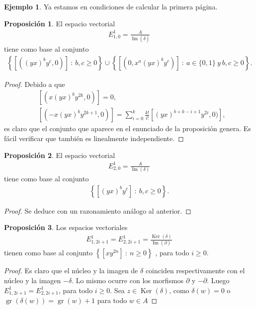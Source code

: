 \documentclass[a4paper,oneside,fleqn,11pt]{report}
\theoremstyle{definition}
\theoremstyle{definition}
\newtheorem{example}{Ejemplo}[section]
\newtheorem{prop}{Proposición}
\numberwithin{prop}{subsection}
\DeclareMathOperator\Ima{Im}
\DeclareMathOperator\Ker{Ker}
\DeclareMathOperator\gr{gr}
\begin{document}
\begin{example}
Ya estamos en condiciones de calcular la primera página. 
\begin{prop}
	El espacio vectorial
	\begin{align*}
		E_{1,0}^1 = \frac{A}{\Ima(\overline{\delta})}
	\end{align*}
	tiene como base al conjunto
	\begin{align*}
		\left\{ \left[((yx)^by^c, 0)\right]\ :\ b,c \geq 0\right\}
			\cup \left\{ \left[(0, x^a(yx)^by^c)\right]\ :\ a \in \{0, 1\}\ y\ b,c \geq 0\right\}. 
	\end{align*}
\end{prop}
\begin{proof}
	Debido a que
	\begin{align*}
		&\left[(x(yx)^by^{2k}, 0)\right] = 0, \\
		&\left[(-x(yx)^by^{2k + 1}, 0)\right] = \sum_{i = 0}^{k}\frac{k!}{i!}\left[(yx)^{b + k - i + 1}y^{2i}, 0)\right],
	\end{align*}
	es claro que el conjunto que aparece en el enunciado de la proposición genera. Es fácil verificar
	que también es linealmente independiente.
\end{proof}
\begin{prop}
	El espacio vectorial
	\begin{align*}
		E_{2,0}^1 = \frac{A}{\Ima(\delta)}
	\end{align*}
	tiene como base al conjunto
	\begin{align*}
		\left\{ \left[(yx)^by^c\right] \ :\ b,c \geq 0\right\}. 
	\end{align*}
\end{prop}
\begin{proof}
	Se deduce con un razonamiento análogo al anterior.
\end{proof}
\begin{prop}
	Los espacios vectoriales
	\begin{align*}
		E_{1,2i + 1}^1 = E_{2, 2i + 1}^1 = \frac{\Ker(\delta)}{\Ima(\partial)}
	\end{align*}
	tienen como base al conjunto $\left\{ \left[xy^{2n}\right] \ :\ n \geq 0\right\}$ , para todo $i \geq 0$.
\end{prop}
\begin{proof}
	Es claro que el núcleo y la imagen de $\delta$ coinciden respectivamente con el núcleo
	y la imagen $-\delta$. Lo mismo ocurre con los morfismos
	$\partial$ y $-\partial$. Luego $E_{1,2i + 1}^1 = E_{2, 2i + 1}^1$, para todo $i \geq 0$.
	Sea $z \in \Ker(\delta)$, como $\delta(w) = 0$ o $\gr(\delta(w)) = \gr(w) + 1$ para todo $w \in A$

\end{proof}
\end{example}
\end{document}

